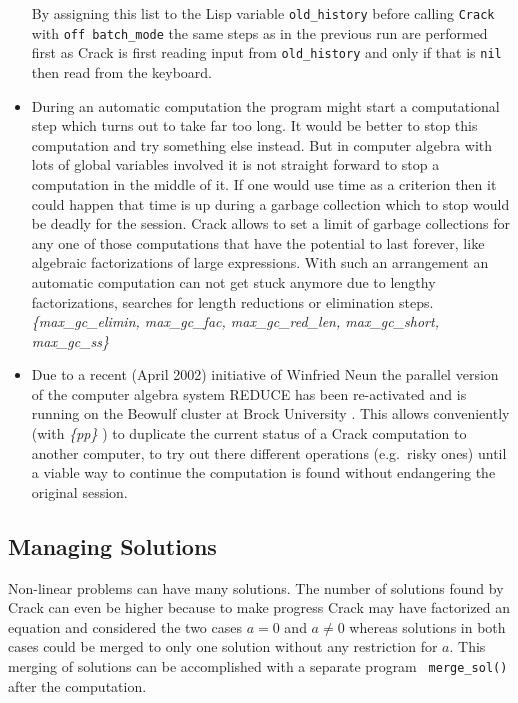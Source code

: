 \documentclass[12pt]{article}
\begin{document}
\begin{itemize}
    By assigning this list to the {\sc Lisp} variable {\tt old\_history} 
    before calling {\tt Crack} with {\tt off batch\_mode} the same steps 
    as in the previous run are performed
    first as {\sc Crack} is first reading input from {\tt old\_history} 
    and only if that is {\tt nil} then read from the keyboard.
  \item During an automatic computation the program might start a
    computational step which turns out to take far too long. It would
    be better to stop this computation and try something else instead.
    But in computer algebra with lots of global variables involved it
    is not straight forward to stop a computation in the middle of it.
    If one would use time as a criterion then it could happen that
    time is up during a garbage collection which to stop would
    be deadly for the session. {\sc Crack} allows to
    set a limit of garbage collections for any one of those
    computations that have the potential to last forever, like
    algebraic factorizations of large expressions.
    With such an arrangement an automatic computation
    can not get stuck anymore due to lengthy factorizations, searches
    for length reductions or elimination steps.
    {\em \{max\_gc\_elimin, max\_gc\_fac, max\_gc\_red\_len, 
    max\_gc\_short, max\_gc\_ss\} } 
  \item Due to a recent (April 2002) initiative of Winfried Neun the
    parallel version of the computer algebra system REDUCE has been
    re-activated and is running on the Beowulf cluster at Brock
    University \cite{MelNeun}. This allows conveniently (with {\em
    \{pp\} }) to duplicate the current status of a {\sc Crack}
    computation to another computer, to try out there different
    operations (e.g.\ risky ones) until a viable way to continue the
    computation is found without endangering the original session.
  \end{itemize}

\subsection{Managing Solutions}
  Non-linear problems can have many solutions. The number of solutions
  found by {\sc Crack} can even be higher because to make progress
  {\sc Crack} may have factorized an equation and considered the two
  cases $a=0$ and $a \neq 0$ whereas solutions in both cases could be
  merged to only one solution without any restriction for $a$. This merging
  of solutions can be accomplished with a separate program {\tt
  merge\_sol()} after the computation.
\end{document}
